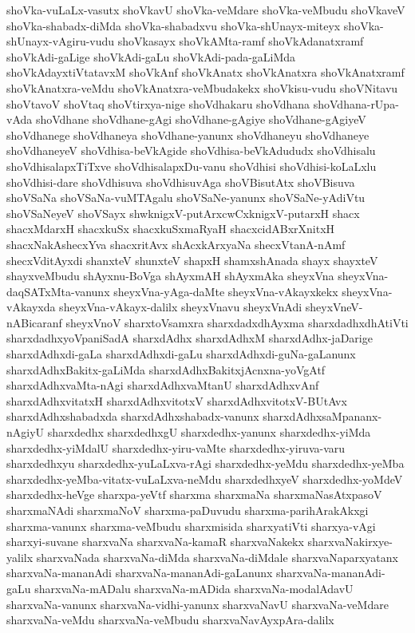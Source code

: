{shoVka-vuLaLx-vasutx
shoVkavU
shoVka-veMdare
shoVka-veMbudu
shoVkaveV
shoVka-shabadx-diMda
shoVka-shabadxvu
shoVka-shUnayx-miteyx
shoVka-shUnayx-vAgiru-vudu
shoVkasayx
shoVkAMta-ramf
shoVkAdanatxramf
shoVkAdi-gaLige
shoVkAdi-gaLu
shoVkAdi-pada-gaLiMda
shoVkAdayxtiVtatavxM
shoVkAnf
shoVkAnatx
shoVkAnatxra
shoVkAnatxramf
shoVkAnatxra-veMdu
shoVkAnatxra-veMbudakekx
shoVkisu-vudu
shoVNitavu
shoVtavoV
shoVtaq
shoVtirxya-nige
shoVdhakaru
shoVdhana
shoVdhana-rUpa-vAda
shoVdhane
shoVdhane-gAgi
shoVdhane-gAgiye
shoVdhane-gAgiyeV
shoVdhanege
shoVdhaneya
shoVdhane-yanunx
shoVdhaneyu
shoVdhaneye
shoVdhaneyeV
shoVdhisa-beVkAgide
shoVdhisa-beVkAdududx
shoVdhisalu
shoVdhisalapxTiTxve
shoVdhisalapxDu-vanu
shoVdhisi
shoVdhisi-koLaLxlu
shoVdhisi-dare
shoVdhisuva
shoVdhisuvAga
shoVBisutAtx
shoVBisuva
shoVSaNa
shoVSaNa-vuMTAgalu
shoVSaNe-yanunx
shoVSaNe-yAdiVtu
shoVSaNeyeV
shoVSayx
shwknigxV-putArxcwCxknigxV-putarxH
shacx
shacxMdarxH
shacxkuSx
shacxkuSxmaRyaH
shacxcidABxrXnitxH
shacxNakAshecxYva
shacxritAvx
shAcxkArxyaNa
shecxVtanA-nAmf
shecxVditAyxdi
shanxteV
shunxteV
shapxH
shamxshAnada
shayx
shayxteV
shayxveMbudu
shAyxnu-BoVga
shAyxmAH
shAyxmAka
sheyxVna
sheyxVna-daqSATxMta-vanunx
sheyxVna-yAga-daMte
sheyxVna-vAkayxkekx
sheyxVna-vAkayxda
sheyxVna-vAkayx-dalilx
sheyxVnavu
sheyxVnAdi
sheyxVneV-nABicaranf
sheyxVnoV
sharxtoVsamxra
sharxdadxdhAyxma
sharxdadhxdhAtiVti
sharxdadhxyoVpaniSadA
sharxdAdhx
sharxdAdhxM
sharxdAdhx-jaDarige
sharxdAdhxdi-gaLa
sharxdAdhxdi-gaLu
sharxdAdhxdi-guNa-gaLanunx
sharxdAdhxBakitx-gaLiMda
sharxdAdhxBakitxjAcnxna-yoVgAtf
sharxdAdhxvaMta-nAgi
sharxdAdhxvaMtanU
sharxdAdhxvAnf
sharxdAdhxvitatxH
sharxdAdhxvitotxV
sharxdAdhxvitotxV-BUtAvx
sharxdAdhxshabadxda
sharxdAdhxshabadx-vanunx
sharxdAdhxsaMpananx-nAgiyU
sharxdedhx
sharxdedhxgU
sharxdedhx-yanunx
sharxdedhx-yiMda
sharxdedhx-yiMdalU
sharxdedhx-yiru-vaMte
sharxdedhx-yiruva-varu
sharxdedhxyu
sharxdedhx-yuLaLxva-rAgi
sharxdedhx-yeMdu
sharxdedhx-yeMba
sharxdedhx-yeMba-vitatx-vuLaLxva-neMdu
sharxdedhxyeV
sharxdedhx-yoMdeV
sharxdedhx-heVge
sharxpa-yeVtf
sharxma
sharxmaNa
sharxmaNasAtxpasoV
sharxmaNAdi
sharxmaNoV
sharxma-paDuvudu
sharxma-parihArakAkxgi
sharxma-vanunx
sharxma-veMbudu
sharxmisida
sharxyatiVti
sharxya-vAgi
sharxyi-suvane
sharxvaNa
sharxvaNa-kamaR
sharxvaNakekx
sharxvaNakirxye-yalilx
sharxvaNada
sharxvaNa-diMda
sharxvaNa-diMdale
sharxvaNaparxyatanx
sharxvaNa-mananAdi
sharxvaNa-mananAdi-gaLanunx
sharxvaNa-mananAdi-gaLu
sharxvaNa-mADalu
sharxvaNa-mADida
sharxvaNa-modalAdavU
sharxvaNa-vanunx
sharxvaNa-vidhi-yanunx
sharxvaNavU
sharxvaNa-veMdare
sharxvaNa-veMdu
sharxvaNa-veMbudu
sharxvaNavAyxpAra-dalilx
}
